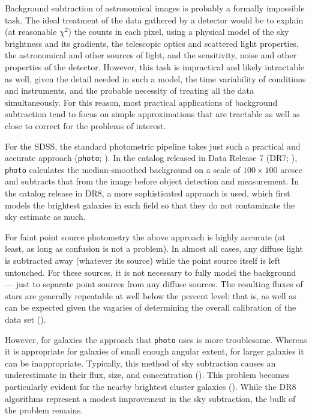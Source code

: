 \documentclass[10pt,preprint]{aastex}
\begin{document}
Background subtraction of astronomical images is probably a formally
impossible task.  The ideal treatment of the data gathered by a
detector would be to explain (at reasonable $\chi^2$) the counts in
each pixel, using a physical model of the sky brightness and its
gradients, the telescopic optics and scattered light properties, the
astronomical and other sources of light, and the sensitivity, noise
and other properties of the detector.
However, this task is impractical and likely intractable as well,
given the detail needed in such a model, the time variability of
conditions and instruments, and the probable necessity of treating all
the data simultaneously. For this reason, most practical applications
of background subtraction tend to focus on simple approximations that
are tractable as well as close to correct for the problems of
interest.

For the SDSS, the standard photometric pipeline takes just such a
practical and accurate approach ({\tt photo}; \citealt{lupton01a}). In
the catalog released in Data Release 7 (DR7; \citealt{abazajian09a}),
{\tt photo} calculates the median-smoothed background on a scale of
$100\times100$ arcsec and subtracts that from the image before object
detection and measurement.  In the catalog release in DR8, a more
sophisticated approach is used, which first models the brightest
galaxies in each field so that they do not contaminate the sky
estimate as much.

For faint point source photometry the above approach is highly
accurate (at least, as long as confusion is not a problem). In almost
all cases, any diffuse light is subtracted away (whatever its source)
while the point source itself is left untouched. For these sources, it
is not necessary to fully model the background --- just to separate
point sources from any diffuse sources. The resulting fluxes of stars
are generally repeatable at well below the percent level; that is, as
well as can be expected given the vagaries of determining the overall
calibration of the data set (\citealt{padmanabhan07a}).

However, for galaxies the approach that {\tt photo} uses is more
troublesome.  Whereas it is appropriate for galaxies of small enough
angular extent, for larger galaxies it can be inappropriate.
Typically, this method of sky subtraction causes an underestimate in
their flux, size, and concentration (\citealt{west05a, blanton05b,
hyde09a, west10a}). This problem becomes particularly evident for the
nearby brightest cluster galaxies (\citealt{bernardi07a,
lauer07a}). While the DR8 algorithms represent a modest improvement in
the sky subtraction, the bulk of the problem remains.
\end{document}
